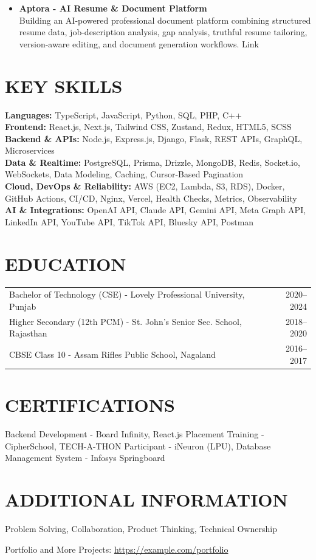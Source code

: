 \documentclass[a4paper,11pt]{article}
\begin{document}
\begin{itemize}
  \vspace{2pt}
  \item[\textbullet] \textbf{Aptora - AI Resume \& Document Platform} \\
  Building an AI-powered professional document platform combining structured resume data, job-description analysis, gap analysis, truthful resume tailoring, version-aware editing, and document generation workflows. Link
  \vspace{2pt}
\end{itemize}

\section*{KEY SKILLS}
\noindent
\textbf{Languages:} TypeScript, JavaScript, Python, SQL, PHP, C++ \\[5pt]
\textbf{Frontend:} React.js, Next.js, Tailwind CSS, Zustand, Redux, HTML5, SCSS \\[5pt]
\textbf{Backend \& APIs:} Node.js, Express.js, Django, Flask, REST APIs, GraphQL, Microservices \\[5pt]
\textbf{Data \& Realtime:} PostgreSQL, Prisma, Drizzle, MongoDB, Redis, Socket.io, WebSockets, Data Modeling, Caching, Cursor-Based Pagination \\[5pt]
\textbf{Cloud, DevOps \& Reliability:} AWS (EC2, Lambda, S3, RDS), Docker, GitHub Actions, CI/CD, Nginx, Vercel, Health Checks, Metrics, Observability \\[5pt]
\textbf{AI \& Integrations:} OpenAI API, Claude API, Gemini API, Meta Graph API, LinkedIn API, YouTube API, TikTok API, Bluesky API, Postman
\section*{EDUCATION}
\begin{tabularx}{\textwidth}{@{}Xr@{}}
Bachelor of Technology (CSE) - Lovely Professional University, Punjab & 2020–2024 \\
Higher Secondary (12th PCM) - St. John’s Senior Sec. School, Rajasthan & 2018–2020 \\
CBSE Class 10 - Assam Rifles Public School, Nagaland & 2016–2017 \\
\end{tabularx}

\section*{CERTIFICATIONS}
Backend Development - Board Infinity, React.js Placement Training - CipherSchool, TECH-A-THON Participant - iNeuron (LPU), Database Management System - Infosys Springboard
\section*{ADDITIONAL INFORMATION}
Problem Solving, Collaboration, Product Thinking, Technical Ownership
\vspace{6pt}
\begin{center}
    Portfolio and More Projects: \href{https://example.com/portfolio}{https://example.com/portfolio}
\end{center}
\end{document}
